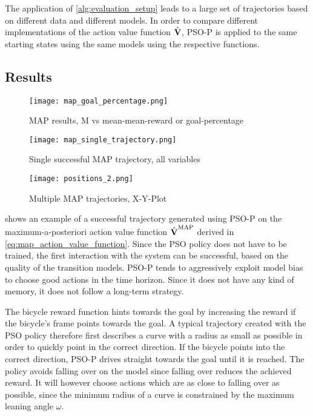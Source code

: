 The application of \cref{alg:evaluation_setup} leads to a large set of trajectories based on different data and different models.
In order to compare different implementations of the action value function $\operatorname{\hat{\operatorname{\mathbf{V}}}}$, PSO-P is applied to the same starting states using the same models using the respective functions.

\subsection{Results}
\begin{figure}[tp]
    \centering
    \texttt{[image: map\_goal\_percentage.png]}
    \caption{MAP results, M vs mean-mean-reward or goal-percentage}
    \label{fig:map_results}
\end{figure}
\begin{figure}[tp]
    \centering
    \texttt{[image: map\_single\_trajectory.png]}
    \caption{Single successful MAP trajectory, all variables}
    \label{fig:map_successful_trajectory}
\end{figure}
\begin{figure}[p]
    \centering
    \texttt{[image: positions\_2.png]}
    \caption{Multiple MAP trajectories, X-Y-Plot}
    \label{fig:map_trajectories}
\end{figure}
 shows an example of a successful trajectory generated using PSO-P on the maximum-a-posteriori action value function $\operatorname{\hat{\operatorname{\mathbf{V}}}}^{\text{MAP}}$ derived in \cref{eq:map_action_value_function}.
Since the PSO policy does not have to be trained, the first interaction with the system can be successful, based on the quality of the transition models.
PSO-P tends to aggressively exploit model bias to choose good actions in the time horizon.
Since it does not have any kind of memory, it does not follow a long-term strategy.

The bicycle reward function hints towards the goal by increasing the reward if the bicycle's frame points towards the goal.
A typical trajectory created with the PSO policy therefore first describes a curve with a radius as small as possible in order to quickly point in the correct direction.
If the bicycle points into the correct direction, PSO-P drives straight towards the goal until it is reached.
The policy avoids falling over on the model since falling over reduces the achieved reward.
It will however choose actions which are as close to falling over as possible, since the minimum radius of a curve is constrained by the maximum leaning angle $\omega$.


